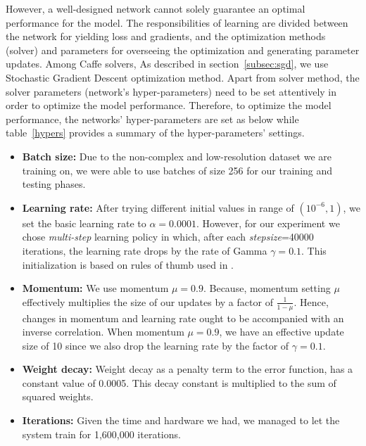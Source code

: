 However, a well-designed network cannot solely guarantee an optimal performance for the model. The responsibilities of learning are divided between the network for yielding loss and gradients, and the optimization methods (solver) and parameters for overseeing the optimization and generating parameter updates. Among Caffe solvers, As described in section~\ref{subsec:sgd}, we use Stochastic Gradient Descent optimization method. Apart from solver method, the solver parameters (network's hyper-parameters) need to be set attentively in order to optimize the model performance. Therefore, to optimize the model performance, the networks' hyper-parameters are set as below while table~\ref{hypers} provides a summary of the hyper-parameters' settings. 
\begin{itemize}

\item \textbf{Batch size:} Due to the non-complex and low-resolution dataset we are training on, we were able to use batches of size 256 for our training and testing phases.

\item \textbf{Learning rate:} After trying different initial values in range of $(10^{-6}, 1)$, we set the basic learning rate to $\alpha = 0.0001$. However, for our experiment we chose \textit{multi-step} learning policy in which, after each \textit{stepsize}=40000 iterations, the learning rate drops by the rate of Gamma $\gamma = 0.1$. This initialization is based on rules of thumb used in \cite{krizhevsky2012imagenet}.

\item \textbf{Momentum:} We use momentum $\mu = 0.9$. Because, momentum setting $\mu$ effectively multiplies the size of our updates by a factor of $\frac{1}{1-\mu}$. Hence, changes in momentum and learning rate ought to be accompanied with an inverse correlation. When momentum $\mu = 0.9$, we have an effective update size of 10 since we also drop the learning rate by the factor of $\gamma= 0.1$.

%

\item \textbf{Weight decay:} Weight decay as a penalty term to the error function, has a constant value of 0.0005. This decay constant is multiplied to the sum of squared weights.

\item \textbf{Iterations:} Given the time and hardware we had, we managed to let the system train for 1,600,000 iterations.

\end{itemize}

